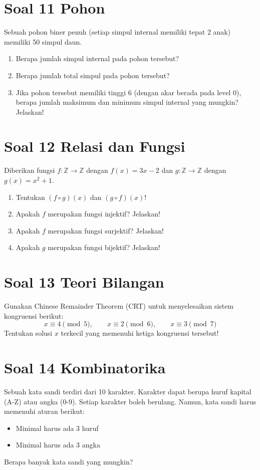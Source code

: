 \documentclass[12pt,a4paper]{article}
\begin{document}
\section*{Soal 11 Pohon}
Sebuah pohon biner penuh (setiap simpul internal memiliki tepat 2 anak) memiliki 50 simpul daun.
\begin{enumerate}[label=(\alph*)]
    \item Berapa jumlah simpul internal pada pohon tersebut?
    \item Berapa jumlah total simpul pada pohon tersebut?
    \item Jika pohon tersebut memiliki tinggi 6 (dengan akar berada pada level 0), berapa jumlah maksimum dan minimum simpul internal yang mungkin? Jelaskan!
\end{enumerate}

\section*{Soal 12 Relasi dan Fungsi}
Diberikan fungsi $f: \mathbb{Z} \to \mathbb{Z}$ dengan $f(x) = 3x - 2$ dan $g: \mathbb{Z} \to \mathbb{Z}$ dengan $g(x) = x^2 + 1$.
\begin{enumerate}[label=(\alph*)]
    \item Tentukan $(f \circ g)(x)$ dan $(g \circ f)(x)$!
    \item Apakah $f$ merupakan fungsi injektif? Jelaskan!
    \item Apakah $f$ merupakan fungsi surjektif? Jelaskan!
    \item Apakah $g$ merupakan fungsi bijektif? Jelaskan!
\end{enumerate}

\section*{Soal 13 Teori Bilangan}
Gunakan Chinese Remainder Theorem (CRT) untuk menyelesaikan sistem kongruensi berikut:
$$x \equiv 4 \pmod{5}, \qquad x \equiv 2 \pmod{6}, \qquad x \equiv 3 \pmod{7}$$
Tentukan solusi $x$ terkecil yang memenuhi ketiga kongruensi tersebut!

\section*{Soal 14 Kombinatorika}
Sebuah kata sandi terdiri dari 10 karakter. Karakter dapat berupa huruf kapital (A-Z) atau angka (0-9). Setiap karakter boleh berulang. Namun, kata sandi harus memenuhi aturan berikut:
\begin{itemize}
    \item Minimal harus ada 3 huruf
    \item Minimal harus ada 3 angka
\end{itemize}
Berapa banyak kata sandi yang mungkin?
\end{document}
